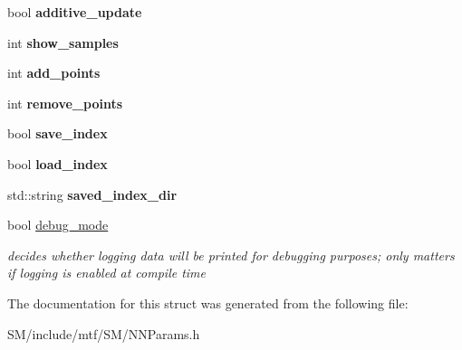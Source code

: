 \begin{DoxyCompactItemize}
\item 
\hypertarget{structNNParams_adff21234a47dd41823bc92201b053f17}{bool {\bfseries additive\-\_\-update}}\label{structNNParams_adff21234a47dd41823bc92201b053f17}

\item 
\hypertarget{structNNParams_a083e58740c04ce6bda9d23b39ae3f5b3}{int {\bfseries show\-\_\-samples}}\label{structNNParams_a083e58740c04ce6bda9d23b39ae3f5b3}

\item 
\hypertarget{structNNParams_a0d07daa5ca547c8a1955b02ebec442f8}{int {\bfseries add\-\_\-points}}\label{structNNParams_a0d07daa5ca547c8a1955b02ebec442f8}

\item 
\hypertarget{structNNParams_adaaf7914e6f0cbd860a97fd6d6ff03ef}{int {\bfseries remove\-\_\-points}}\label{structNNParams_adaaf7914e6f0cbd860a97fd6d6ff03ef}

\item 
\hypertarget{structNNParams_af0a21420b6774d4319a0c35c1f3cbab5}{bool {\bfseries save\-\_\-index}}\label{structNNParams_af0a21420b6774d4319a0c35c1f3cbab5}

\item 
\hypertarget{structNNParams_a5eed232dd2ff61523bd132e6f2895ff1}{bool {\bfseries load\-\_\-index}}\label{structNNParams_a5eed232dd2ff61523bd132e6f2895ff1}

\item 
\hypertarget{structNNParams_a7bd0f622030e5cf62e7c7526e6001eda}{std\-::string {\bfseries saved\-\_\-index\-\_\-dir}}\label{structNNParams_a7bd0f622030e5cf62e7c7526e6001eda}

\item 
\hypertarget{structNNParams_af493e2593da01a9fd10b1b1849a53def}{bool \hyperlink{structNNParams_af493e2593da01a9fd10b1b1849a53def}{debug\-\_\-mode}}\label{structNNParams_af493e2593da01a9fd10b1b1849a53def}

\begin{DoxyCompactList}\small\item\em decides whether logging data will be printed for debugging purposes; only matters if logging is enabled at compile time \end{DoxyCompactList}\end{DoxyCompactItemize}


The documentation for this struct was generated from the following file\-:\begin{DoxyCompactItemize}
\item 
S\-M/include/mtf/\-S\-M/N\-N\-Params.\-h\end{DoxyCompactItemize}
